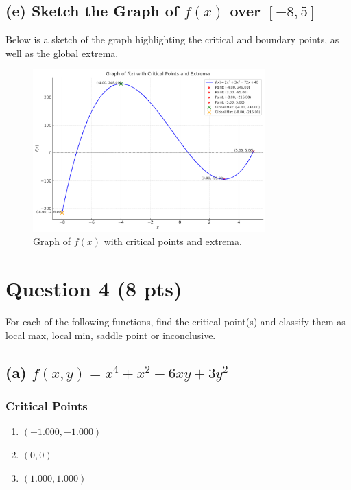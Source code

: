 \documentclass[12pt]{article}
\begin{document}
\subsection*{(e) Sketch the Graph of \( f(x) \) over \([-8, 5]\)}

Below is a sketch of the graph highlighting the critical and boundary points, as well as the global extrema.

\begin{figure}[h!]
    \centering
    \includegraphics[width=0.8\textwidth]{q3.png} %
    \caption{Graph of \( f(x) \) with critical points and extrema.}
    \label{fig:f_graph}
\end{figure}

\newpage

\section*{Question 4 (8 pts)}

For each of the following functions, find the critical point(s) and classify them as local max, local min, saddle point or inconclusive.

\subsection*{(a) \( f(x, y) = x^4 + x^2 - 6xy + 3y^2 \)}

\subsubsection*{Critical Points}
\begin{enumerate}
    \item \((-1.000, -1.000)\)
    \item \((0, 0)\)
    \item \((1.000, 1.000)\)
\end{enumerate}
\end{document}
